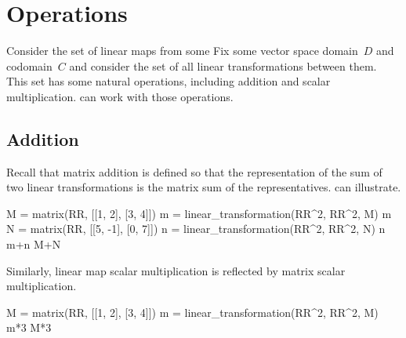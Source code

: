 \section{Operations}

Consider the set of linear maps from some 
Fix some vector space domain~$D$ and codomain~$C$ and consider the
set of all linear transformations between them. 
This set has some natural operations, including
addition and scalar multiplication.
\Sage{} can work with those operations.

\subsection{Addition}
Recall that matrix addition is defined so that the representation of
the sum of two linear transformations is the matrix sum of the representatives.
\Sage{} can illustrate.
\begin{sageoutput}[s,6,68,62;s,7,70,62;s,14,68,62;s,15,70,62;s,20,68,62;s,21,70,62]
M = matrix(RR, [[1, 2], [3, 4]])
m = linear_transformation(RR^2, RR^2, M)
m
N = matrix(RR, [[5, -1], [0, 7]])
n = linear_transformation(RR^2, RR^2, N)
n
m+n
M+N
\end{sageoutput}
\noindent Similarly, linear map scalar multiplication is reflected by 
matrix scalar multiplication.
\begin{sageoutput}[d,0,2;s,6,68,62;s,7,70,62]
M = matrix(RR, [[1, 2], [3, 4]])
m = linear_transformation(RR^2, RR^2, M)
m*3
M*3  
\end{sageoutput}



